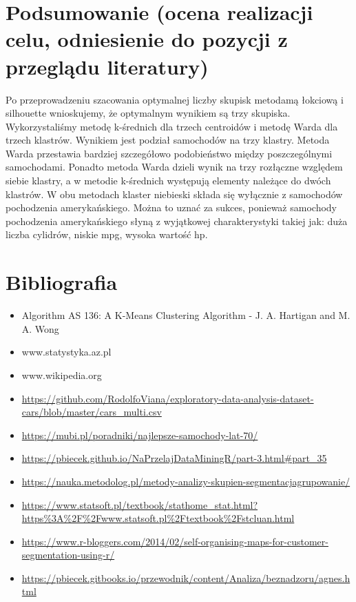 \documentclass{article}
\begin{document}
\section{Podsumowanie (ocena realizacji celu, odniesienie do pozycji z przeglądu literatury)}
Po przeprowadzeniu szacowania optymalnej liczby skupisk metodamą łokciową i silhouette wnioskujemy, że optymalnym wynikiem są trzy skupiska.
Wykorzystaliśmy metodę k-średnich dla trzech centroidów i metodę Warda dla trzech klastrów. Wynikiem jest podział samochodów na trzy klastry.
Metoda Warda przestawia bardziej szczegółowo podobieństwo między poszczególnymi samochodami. Ponadto metoda Warda dzieli wynik na trzy rozłączne
względem siebie klastry, a w metodie k-średnich występują elementy należące do dwóch klastrów. W obu metodach klaster niebieski składa się 
wyłącznie z samochodów pochodzenia amerykańskiego. Można to uznać za sukces, ponieważ samochody pochodzenia amerykańskiego słyną z wyjątkowej
charakterystyki takiej jak: duża liczba cylidrów, niskie mpg, wysoka wartość hp.


\section{Bibliografia}
    \begin{itemize}
        \item Algorithm AS 136: A K-Means Clustering Algorithm - J. A. Hartigan and M. A. Wong
        \item www.statystyka.az.pl
        \item www.wikipedia.org
        \item \url{https://github.com/RodolfoViana/exploratory-data-analysis-dataset-cars/blob/master/cars_multi.csv}
        \item \url{https://mubi.pl/poradniki/najlepsze-samochody-lat-70/}
        \item \url{https://pbiecek.github.io/NaPrzelajDataMiningR/part-3.html#part_35}
        \item \url{https://nauka.metodolog.pl/metody-analizy-skupien-segmentacjagrupowanie/}
        \item \url{https://www.statsoft.pl/textbook/stathome_stat.html?https\%3A%2F%2Fwww.statsoft.pl%2Ftextbook%2Fstcluan.html}
        \item \url{https://www.r-bloggers.com/2014/02/self-organising-maps-for-customer-segmentation-using-r/}
        \item \url{https://pbiecek.gitbooks.io/przewodnik/content/Analiza/beznadzoru/agnes.html}
    \end{itemize}
\end{document}
